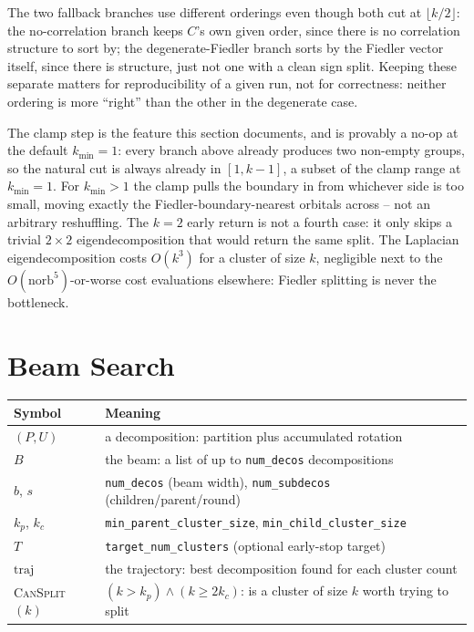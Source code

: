 \documentclass[10pt]{article}
\begin{document}
The two fallback branches use different orderings even though both cut at $\lfloor k/2\rfloor$:
the no-correlation branch keeps $C$'s own given order, since there is no correlation structure
to sort by; the degenerate-Fiedler branch sorts by the Fiedler vector itself, since there is
structure, just not one with a clean sign split. Keeping these separate matters for
reproducibility of a given run, not for correctness: neither ordering is more ``right'' than the
other in the degenerate case.

The clamp step is the feature this section documents, and is provably a no-op at the default
$k_{\min}=1$: every branch above already produces two non-empty groups, so the natural cut is
always already in $[1,k-1]$, a subset of the clamp range at $k_{\min}=1$. For $k_{\min}>1$ the
clamp pulls the boundary in from whichever side is too small, moving exactly the
Fiedler-boundary-nearest orbitals across -- not an arbitrary reshuffling. The $k=2$ early return
is not a fourth case: it only skips a trivial $2\times2$ eigendecomposition that would return the
same split. The Laplacian eigendecomposition costs $O(k^3)$ for a cluster of size $k$, negligible
next to the $O(\mathrm{norb}^5)$-or-worse cost evaluations elsewhere: Fiedler splitting is never
the bottleneck.

\section{Beam Search}
\label{sec:beam}

\begin{center}
\begin{tabular}{ll}
\toprule
Symbol & Meaning \\
\midrule
$(P,U)$ & a decomposition: partition plus accumulated rotation \\
$B$ & the beam: a list of up to \texttt{num\_decos} decompositions \\
$b$, $s$ & \texttt{num\_decos} (beam width), \texttt{num\_subdecos} (children/parent/round) \\
$k_p$, $k_c$ & \texttt{min\_parent\_cluster\_size}, \texttt{min\_child\_cluster\_size} \\
$T$ & \texttt{target\_num\_clusters} (optional early-stop target) \\
$\mathrm{traj}$ & the trajectory: best decomposition found for each cluster count \\
\textsc{CanSplit}$(k)$ & $(k>k_p)\wedge(k\ge 2k_c)$: is a cluster of size $k$ worth trying to split \\
\bottomrule
\end{tabular}
\end{center}
\end{document}
